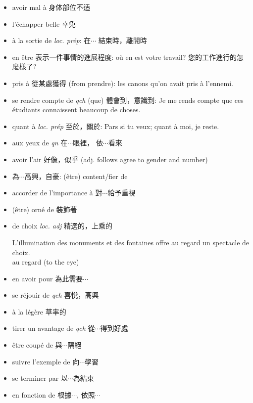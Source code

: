 \documentclass{book}
\begin{document}
        \begin{itemize}
            \item avoir mal à 身体部位不适
            \item l'échapper belle 幸免
            \item à la sortie de \textit{loc. prép}: 在$\cdots$ 結束時，離開時
            \item en être 表示一件事情的進展程度: où en est votre travail? 您的工作進行的怎麼樣了?
            \item pris à 從某處獲得 (from prendre): les canons qu'on avait pris à l'ennemi.
            \item se rendre compte de \textit{qch} (que) 體會到，意識到: Je me rends compte que ces étudiants connaissent beaucoup de choses.
            \item quant à \textit{loc. prép} 至於，關於: Pars si tu veux; quant à moi, je reste.
            \item aux yeux de \textit{qn} 在$\cdots$眼裡， 依$\cdots$看來
            \item avoir l'air 好像，似乎 (adj. follows agree to gender and number)
            \item 為$\cdots$高興，自豪: (être) content/fier de
            \item accorder de l'importance à 對$\cdots$給予重視
            \item (être) orné de 裝飾著
            \item de choix \textit{loc. adj} 精選的，上乘的
                \begin{center}
                    L'illumination des monuments et des fontaines offre au regard un spectacle de choix.
                    \\
                    au regard (to the eye)
                \end{center}
            \item en avoir pour 為此需要$\cdots$
            \item se réjouir de \textit{qch} 喜悅，高興
            \item à la légère 草率的
            \item tirer un avantage de \textit{qch} 從$\cdots$得到好處
            \item être coupé de 與$\cdots$隔絕
            \item suivre l'exemple de 向$\cdots$學習
            \item se terminer par 以$\cdots$為結束
            \item en fonction de 根據$\cdots$, 依照$\cdots$

\end{itemize}
\end{document}
